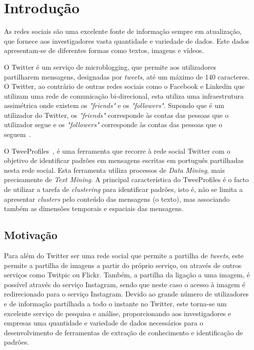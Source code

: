 \chapter{Introdução} \label{chap:intro}


As redes sociais são uma excelente fonte de informação sempre em atualização, que fornece aos investigadores vasta quantidade e variedade de dados. Este dados apresentam-se de diferentes formas como textos, imagens e vídeos. 

O Twitter é um serviço de microblogging, que permite aos utilizadores partilharem mensagens, designadas por \textit{tweets}, até um máximo de 140 caracteres. O Twitter, ao contrário de outras redes sociais como o Facebook e Linkedin que utilizam uma rede de comunicação bi-direcional, esta utiliza uma infraestrutura assimétrica onde existem os \textit{"friends"} e os \textit{"followers"}. Supondo que é um utilizador do Twitter, os \textit{"friends"} corresponde às contas das pessoas que o utilizador segue e os \textit{"followers"} corresponde às contas das pessoas que o seguem~\citet{Russell2011}.

O TweeProfiles~\citet{Cunha2013}, é uma ferramenta que recorre à rede social Twitter com o objetivo de identificar padrões em mensagens escritas em português partilhadas nesta rede social. Esta ferramenta utiliza processos de \textit{Data Mining}, mais precisamente de \textit{Text Mining}. A principal característica do TweeProfiles é o facto de utilizar a tarefa de \textit{clustering} para identificar padrões, isto é, não se limita a apresentar \textit{clusters} pelo conteúdo das mensagens (o texto), mas associando também as dimensões temporais e espaciais das mensagens. 

\section{Motivação} \label{sec:motiv}

Para além do Twitter ser uma rede social que permite a partilha de \textit{tweets}, este permite a partilha de imagens a partir do próprio serviço, ou através de outros serviços como Twitpic ou Flickr. Também, a partilha da ligação a uma imagem, é possível através do serviço Instagram, sendo que neste caso o acesso à imagem é redirecionado para o serviço Instagram. Devido ao grande número de utilizadores e de informação partilhada a todo o instante no Twitter, este torna-se um excelente serviço de pesquisa e análise, proporcionando aos investigadores e empresas uma quantidade e variedade de dados necessários para o desenvolvimento de ferramentas de extração de conhecimento e identificação de padrões. 

